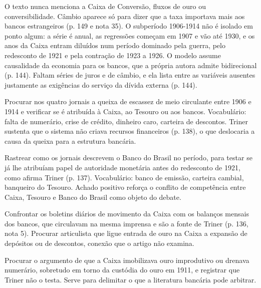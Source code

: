 
O texto nunca menciona a Caixa de Conversão, fluxos de ouro ou conversibilidade. Câmbio aparece só para dizer que a taxa importava mais aos bancos estrangeiros (p. 149 e nota 35). O subperíodo 1906-1914 não é isolado em ponto algum: a série é anual, as regressões começam em 1907 e vão até 1930, e os anos da Caixa entram diluídos num período dominado pela guerra, pelo redesconto de 1921 e pela contração de 1923 a 1926. O modelo assume causalidade da economia para os bancos, que a própria autora admite bidirecional (p. 144). Faltam séries de juros e de câmbio, e ela lista entre as variáveis ausentes justamente as exigências do serviço da dívida externa (p. 144).

\begin{dialogo}
\item Procurar nos quatro jornais a queixa de escassez de meio circulante entre 1906 e 1914 e verificar se é atribuída à Caixa, ao Tesouro ou aos bancos. Vocabulário: falta de numerário, crise de crédito, dinheiro caro, carteira de descontos. Triner sustenta que o sistema não criava recursos financeiros (p. 138), o que deslocaria a causa da queixa para a estrutura bancária.

\item Rastrear como os jornais descrevem o Banco do Brasil no período, para testar se já lhe atribuíam papel de autoridade monetária antes do redesconto de 1921, como afirma Triner (p. 137). Vocabulário: banco de emissão, carteira cambial, banqueiro do Tesouro. Achado positivo reforça o conflito de competência entre Caixa, Tesouro e Banco do Brasil como objeto do debate.

\item Confrontar os boletins diários de movimento da Caixa com os balanços mensais dos bancos, que circulavam na mesma imprensa e são a fonte de Triner (p. 136, nota 5). Procurar articulista que ligue entrada de ouro na Caixa a expansão de depósitos ou de descontos, conexão que o artigo não examina.

\item Procurar o argumento de que a Caixa imobilizava ouro improdutivo ou drenava numerário, sobretudo em torno da custódia do ouro em 1911, e registrar que Triner não o testa. Serve para delimitar o que a literatura bancária pode arbitrar.
\end{dialogo}

